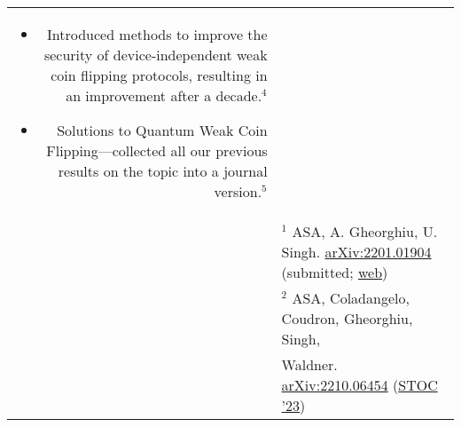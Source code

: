 \documentclass[a4paper,10pt]{article}
\newcommand{\su}[1]{{\tiny $^#1$}}
\begin{document}
\begin{longtable}{r|p{11cm}}
{\begin{itemize}[leftmargin=8pt]
                      \item[] Introduced methods to improve the security of device-independent weak coin flipping protocols, resulting in an improvement after a decade.\su{4}
                      \item[] Solutions to Quantum Weak Coin Flipping---collected all our previous results on the topic into a journal version.\su{5}
                    \end{itemize}
                    } \\

                    &\small{{\tiny $^1$} ASA, A. Gheorghiu, U. Singh. \href{https://arxiv.org/abs/2201.01904}{arXiv:2201.01904} (submitted; \href{https://atulsingharora.github.io/HQC}{web})}\\                                                                     
                    &\small{{\tiny $^2$} ASA, Coladangelo, Coudron, Gheorghiu, Singh,}  \\
                    &\quad \small{Waldner. \href{https://arxiv.org/abs/2210.06454}{arXiv:2210.06454} (\href{http://acm-stoc.org/stoc2023/accepted.html}{STOC '23})} \\


\end{longtable}
\end{document}
